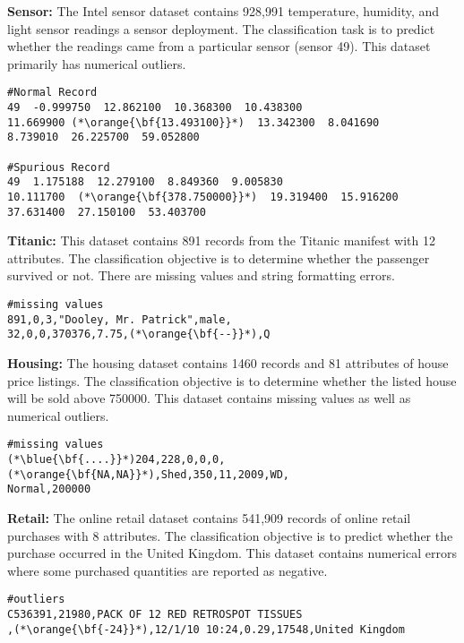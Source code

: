 \vspace{0.5em}\noindent\textbf{Sensor: } The Intel sensor dataset contains 928,991 temperature, humidity, and light sensor readings a sensor deployment. The classification task is to predict whether the readings came from a particular sensor (sensor 49). This dataset primarily has numerical outliers.
\begin{lstlisting}
#Normal Record
49  -0.999750  12.862100  10.368300  10.438300  
11.669900 (*\orange{\bf{13.493100}}*)  13.342300  8.041690  
8.739010  26.225700  59.052800

#Spurious Record
49  1.175188  12.279100  8.849360  9.005830  
10.111700  (*\orange{\bf{378.750000}}*)  19.319400  15.916200  
37.631400  27.150100  53.403700
\end{lstlisting}

\vspace{0.5em}\noindent\textbf{Titanic: } This dataset contains 891 records from the Titanic manifest with 12 attributes. The classification objective is to determine whether the passenger survived or not. There are missing values and string formatting errors.

\begin{lstlisting}
#missing values
891,0,3,"Dooley, Mr. Patrick",male,
32,0,0,370376,7.75,(*\orange{\bf{--}}*),Q
\end{lstlisting}

\vspace{0.5em}\noindent\textbf{Housing: } The housing dataset contains 1460 records and 81 attributes of house price listings. The classification objective is to determine whether the listed house will be sold above 750000. 
This dataset contains missing values as well as numerical outliers.
\begin{lstlisting}
#missing values
(*\blue{\bf{....}}*)204,228,0,0,0,(*\orange{\bf{NA,NA}}*),Shed,350,11,2009,WD,
Normal,200000
\end{lstlisting}

\vspace{0.5em}\noindent\textbf{Retail: } The online retail dataset contains 541,909 records of online retail purchases with 8 attributes. The classification objective is to predict whether the purchase occurred in the United Kingdom.
This dataset contains numerical errors where some purchased quantities are reported as negative.

\begin{lstlisting}
#outliers
C536391,21980,PACK OF 12 RED RETROSPOT TISSUES
,(*\orange{\bf{-24}}*),12/1/10 10:24,0.29,17548,United Kingdom
\end{lstlisting}

